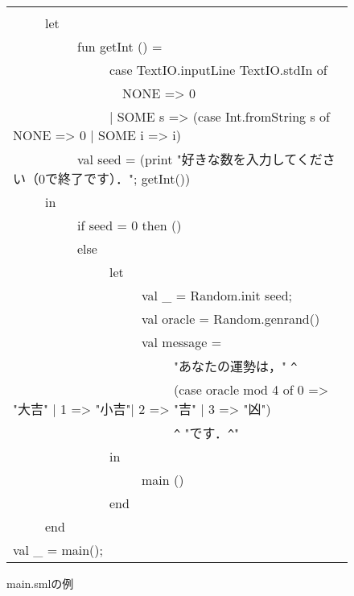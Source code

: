 \documentclass{jbook}
\newenvironment{program}{\begin{tt}\begin{quote}}{\end{quote}\end{tt}}
\newcommand{\myem}{\ \ \ \ \  }
\begin{document}
\begin{figure}[b]
\begin{center}
\begin{tabular}{l}
\begin{minipage}{0.9\textwidth}
\begin{program}
fun main() =\\
\myem  let\\
\myem\myem    fun getInt () = \\
\myem\myem\myem        case TextIO.inputLine TextIO.stdIn of\\
\myem\myem\myem\ \       NONE => 0\\
\myem\myem\myem        | SOME s => (case Int.fromString s of NONE => 0 | SOME i => i)\\
\myem\myem    val seed = (print "好きな数を入力してください（0で終了です）．";  getInt())\\
\myem  in\\
\myem\myem    if seed = 0 then ()\\
\myem\myem    else\\
\myem\myem\myem      let\\
\myem\myem\myem\myem        val \_ = Random.init seed;\\
\myem\myem\myem\myem        val oracle = Random.genrand()\\
\myem\myem\myem\myem        val message = \\
\myem\myem\myem\myem\myem            "あなたの運勢は，" \verb|^|\\
\myem\myem\myem\myem\myem            (case oracle mod 4 of 0 => "大吉" | 1 => "小吉"| 2 => "吉" | 3 => "凶")\\
\myem\myem\myem\myem\myem            \verb|^| "です．\verb|^|"\\
\myem\myem\myem      in\\
\myem\myem\myem\myem        main ()\\
\myem\myem\myem      end\\
\myem  end\\
val \_ = main();
\end{program}
\end{minipage}
\end{tabular}
\caption{main.smlの例}
\label{fig:main}
\end{center}
\end{figure}
\end{document}
